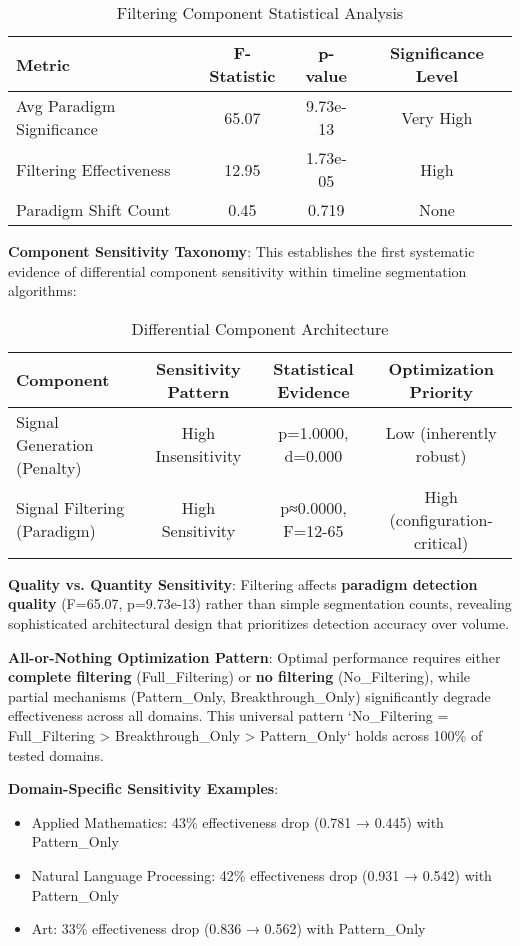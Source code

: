 \documentclass[conference]{IEEEtran}
\begin{document}
\begin{table}[htbp]
\centering
\caption{Filtering Component Statistical Analysis}
\begin{tabular}{@{}lccc@{}}
\toprule
\textbf{Metric} & \textbf{F-Statistic} & \textbf{p-value} & \textbf{Significance Level} \\
\midrule
Avg Paradigm Significance & 65.07 & 9.73e-13 & Very High \\
Filtering Effectiveness & 12.95 & 1.73e-05 & High \\
Paradigm Shift Count & 0.45 & 0.719 & None \\
\bottomrule
\end{tabular}
\end{table}

\textbf{Component Sensitivity Taxonomy}: This establishes the first systematic evidence of differential component sensitivity within timeline segmentation algorithms:

\begin{table}[htbp]
\centering
\caption{Differential Component Architecture}
\begin{tabular}{@{}lccc@{}}
\toprule
\textbf{Component} & \textbf{Sensitivity Pattern} & \textbf{Statistical Evidence} & \textbf{Optimization Priority} \\
\midrule
Signal Generation (Penalty) & High Insensitivity & p=1.0000, d=0.000 & Low (inherently robust) \\
Signal Filtering (Paradigm) & High Sensitivity & p≈0.0000, F=12-65 & High (configuration-critical) \\
\bottomrule
\end{tabular}
\end{table}

\textbf{Quality vs. Quantity Sensitivity}: Filtering affects \textbf{paradigm detection quality} (F=65.07, p=9.73e-13) rather than simple segmentation counts, revealing sophisticated architectural design that prioritizes detection accuracy over volume.

\textbf{All-or-Nothing Optimization Pattern}: Optimal performance requires either \textbf{complete filtering} (Full\_Filtering) or \textbf{no filtering} (No\_Filtering), while partial mechanisms (Pattern\_Only, Breakthrough\_Only) significantly degrade effectiveness across all domains. This universal pattern `No\_Filtering = Full\_Filtering > Breakthrough\_Only > Pattern\_Only` holds across 100\% of tested domains.

\textbf{Domain-Specific Sensitivity Examples}:
\begin{itemize}
\item Applied Mathematics: 43\% effectiveness drop (0.781 → 0.445) with Pattern\_Only
\item Natural Language Processing: 42\% effectiveness drop (0.931 → 0.542) with Pattern\_Only  
\item Art: 33\% effectiveness drop (0.836 → 0.562) with Pattern\_Only
\end{itemize}
\end{document}
